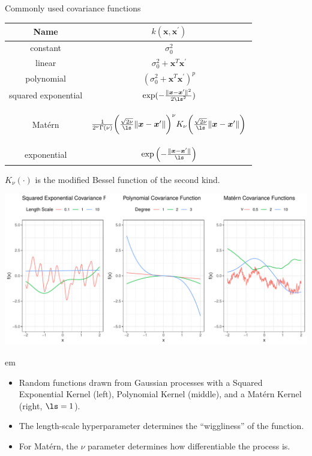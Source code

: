 \documentclass[11pt,compress,t,notes=noshow, xcolor=table]{beamer}
\begin{document}
\begin{vbframe}{Commonly used covariance functions}

\begin{table}[]
\centering
\begin{tabular}{|c|c|}
\hline
Name & $k(\bm{x}, \bm{x}^\prime)$\\
\hline
constant & $\sigma_0^2$ \\ [1em]
linear & $\sigma_0^2 + \bm{x}^T\bm{x}^\prime$ \\ [1em]
polynomial & $(\sigma_0^2 + \bm{x}^T\bm{x}^\prime)^p$ \\ [1em]
squared exponential & $\exp(- \frac{\|\bm{x} - \bm{x}^\prime\|^2}{2\ls^2})$ \\ [1em]
Matérn & \begin{footnotesize} $\frac{1}{2^\nu \Gamma(\nu)}\biggl(\frac{\sqrt{2 \nu}}{\ls}\|\bm{x} - \bm{x}^\prime\|\biggr)^{\nu} K_\nu\biggl(\frac{\sqrt{2 \nu}}{\ls}\|\bm{x} - \bm{x}^\prime\|\biggr)$\end{footnotesize}  \\ [1em]
exponential & $\exp\left(- \frac{\|\bm{x} - \bm{x}^\prime\|}{\ls}\right)$ \\ [1em]
\hline
\end{tabular}
\end{table}
\begin{footnotesize}
$K_\nu(\cdot)$ is the modified Bessel function of the second kind.
\end{footnotesize}


\begin{center}

\includegraphics{figure/covariance.pdf}
\end{center}
 em
\begin{footnotesize}
\begin{itemize}
\item Random functions drawn from Gaussian processes with a Squared Exponential Kernel (left), Polynomial Kernel (middle), and a Matérn Kernel (right, $\ls = 1$). 
\item The length-scale hyperparameter determines the ``wiggliness'' of the function.
\item For Matérn, the $\nu$ parameter determines how differentiable the process is.
\end{itemize}
\end{footnotesize}
\end{vbframe}
\end{document}
